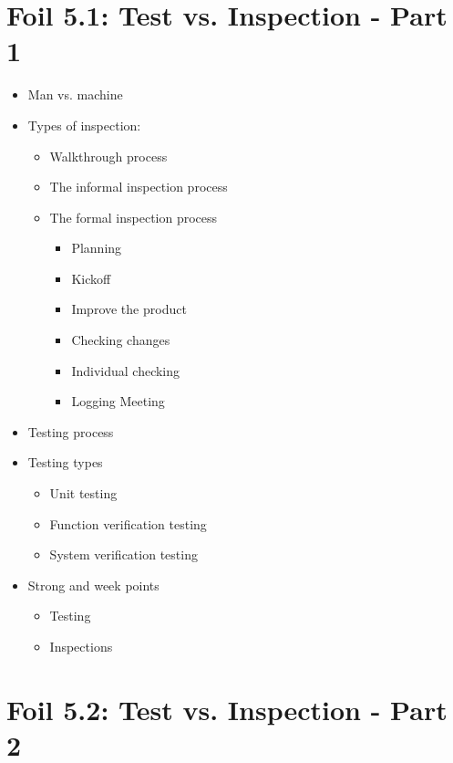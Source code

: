 	\section{Foil 5.1: Test vs. Inspection - Part 1}

		\begin{itemize}
			\item Man vs. machine
			\item Types of inspection:
				\begin{itemize}
					\item Walkthrough process
					\item The informal inspection process
					\item The formal inspection process
						\begin{itemize}
							\item Planning
							\item Kickoff
							\item Improve the product
							\item Checking changes
							\item Individual checking
							\item Logging Meeting
						\end{itemize}
				\end{itemize}
			\item Testing process
			\item Testing types
				\begin{itemize}
					\item Unit testing
					\item Function verification testing
					\item System verification testing
				\end{itemize}
			\item Strong and week points
			\begin{itemize}
				\item Testing 
				\item Inspections
			\end{itemize}
		\end{itemize}

	\section{Foil 5.2: Test vs. Inspection - Part 2}

